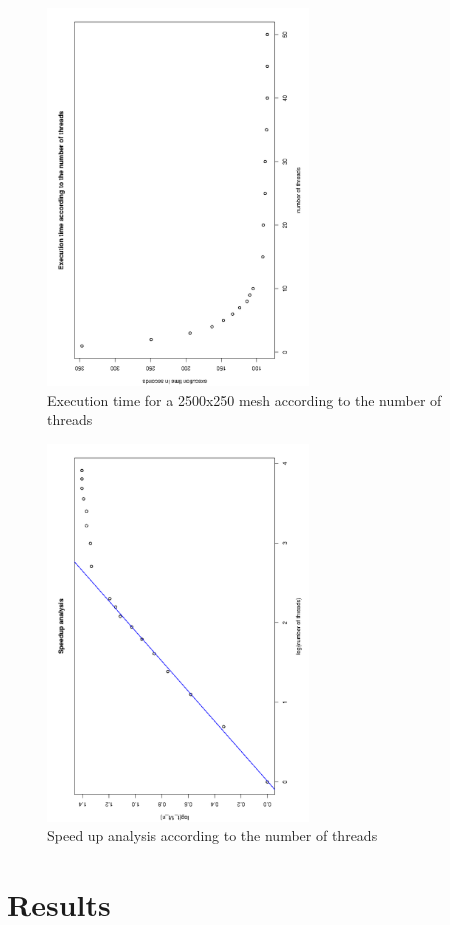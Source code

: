 \documentclass{article}
\begin{document}
\begin{figure}[h!]
\includegraphics[height = 10cm, angle=270]{plots/multithreadingPerformance}
\caption{Execution time for a 2500x250 mesh according to the number of threads}
\label{multithreadingPerformance}
\end{figure}

\begin{figure}[h!]
\includegraphics[height = 10cm, angle=270]{plots/speedUp}
\caption{Speed up analysis according to the number of threads}
\label{speedUp}
\end{figure}





\section{Results}
\end{document}
